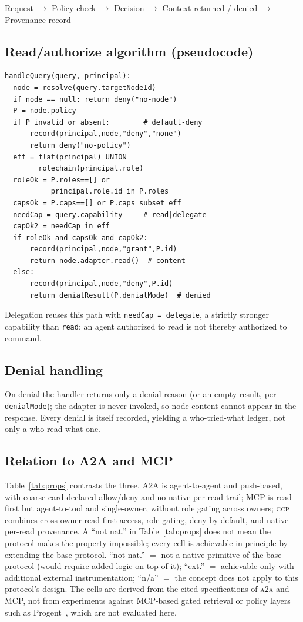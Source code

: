 \documentclass[conference,letterpaper]{IEEEtran}
\newcommand{\gcp}{\textsc{gcp}}
\newcommand{\ata}{\textsc{a2a}}
\begin{document}
\begin{center}\small
Request $\rightarrow$ Policy check $\rightarrow$ Decision
$\rightarrow$ Context returned / denied $\rightarrow$ Provenance record
\end{center}

\subsection{Read/authorize algorithm (pseudocode)}
{\footnotesize
\begin{verbatim}
handleQuery(query, principal):
  node = resolve(query.targetNodeId)
  if node == null: return deny("no-node")
  P = node.policy
  if P invalid or absent:        # default-deny
      record(principal,node,"deny","none")
      return deny("no-policy")
  eff = flat(principal) UNION
        rolechain(principal.role)
  roleOk = P.roles==[] or
           principal.role.id in P.roles
  capsOk = P.caps==[] or P.caps subset eff
  needCap = query.capability     # read|delegate
  capOk2 = needCap in eff
  if roleOk and capsOk and capOk2:
      record(principal,node,"grant",P.id)
      return node.adapter.read()  # content
  else:
      record(principal,node,"deny",P.id)
      return denialResult(P.denialMode)  # denied
\end{verbatim}}
Delegation reuses this path with \texttt{needCap = delegate}, a strictly stronger capability than
\texttt{read}: an agent authorized to read is not thereby authorized to command.

\subsection{Denial handling}
On denial the handler returns only a denial reason (or an empty result, per \texttt{denialMode});
the adapter is never invoked, so node content cannot appear in the response. Every denial is itself
recorded, yielding a who-tried-what ledger, not only a who-read-what one.

\subsection{Relation to A2A and MCP}
Table~\ref{tab:props} contrasts the three. A2A is agent-to-agent and push-based, with coarse
card-declared allow/deny and no native per-read trail; MCP is read-first but agent-to-tool and
single-owner, without role gating across owners; \gcp{} combines cross-owner read-first access,
role gating, deny-by-default, and native per-read provenance. A ``not nat.'' in Table~\ref{tab:props} does
not mean the protocol makes the property impossible; every cell is achievable in principle by
extending the base protocol. ``not nat.'' $=$ not a native primitive of the base protocol (would
require added logic on top of it); ``ext.'' $=$ achievable only with additional external
instrumentation; ``n/a'' $=$ the concept does not apply to this protocol's design. The cells are derived from the cited specifications of \ata{} and MCP, not from experiments against MCP-based gated retrieval or policy layers such as Progent~\citep{shi2025progent}, which are not evaluated here.
\end{document}
